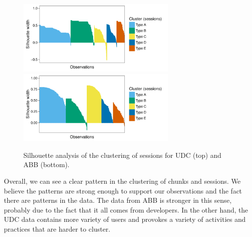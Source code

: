 \begin{figure}[!ht]
	\centering		
	\includegraphics[width=0.7\textwidth]{Figures/UDC_silhouette_sessions}
	\includegraphics[width=0.7\textwidth]{Figures/ABB_silhouette_sessions}	
	\caption{Silhouette analysis of the clustering of sessions for UDC (top) and ABB (bottom).}
	\label{silhouette_sessions}
\end{figure}

Overall, we can see a clear pattern in the clustering of chunks and sessions. We believe the patterns are strong enough to support our observations and the fact there are patterns in the data. The data from ABB is stronger in this sense, probably due to the fact that it all comes from developers. In the other hand, the UDC data contains more variety of users and provokes a variety of activities and practices that are harder to cluster. 








